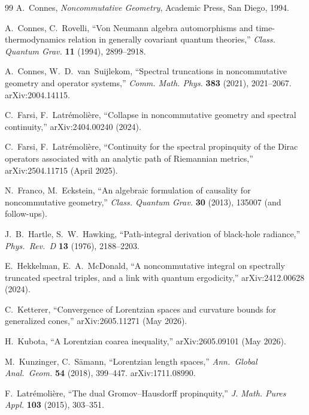 \documentclass[11pt,a4paper]{article}
\theoremstyle{plain}
\theoremstyle{definition}
\begin{document}
\begin{thebibliography}{99}
A.~Connes, \emph{Noncommutative Geometry}, Academic Press, San Diego,
1994.

A.~Connes, C.~Rovelli, ``Von Neumann algebra automorphisms and
time-thermodynamics relation in generally covariant quantum theories,''
\emph{Class. Quantum Grav.} \textbf{11} (1994), 2899--2918.

A.~Connes, W.~D.~van~Suijlekom, ``Spectral truncations in
noncommutative geometry and operator systems,''
\emph{Comm. Math. Phys.} \textbf{383} (2021), 2021--2067.
arXiv:2004.14115.

C.~Farsi, F.~Latr\'emoli\`ere, ``Collapse in noncommutative geometry
and spectral continuity,'' arXiv:2404.00240 (2024).

C.~Farsi, F.~Latr\'emoli\`ere, ``Continuity for the spectral
propinquity of the Dirac operators associated with an analytic path
of Riemannian metrics,'' arXiv:2504.11715 (April 2025).

N.~Franco, M.~Eckstein, ``An algebraic formulation of causality for
noncommutative geometry,''
\emph{Class. Quantum Grav.} \textbf{30} (2013), 135007 (and
follow-ups).

J.~B.~Hartle, S.~W.~Hawking, ``Path-integral derivation of black-hole
radiance,'' \emph{Phys.~Rev.~D} \textbf{13} (1976), 2188--2203.

E.~Hekkelman, E.~A.~McDonald, ``A noncommutative integral on
spectrally truncated spectral triples, and a link with quantum
ergodicity,'' arXiv:2412.00628 (2024).

C.~Ketterer, ``Convergence of Lorentzian spaces and curvature bounds
for generalized cones,'' arXiv:2605.11271 (May 2026).

H.~Kubota, ``A Lorentzian coarea inequality,'' arXiv:2605.09101
(May 2026).

M.~Kunzinger, C.~S\"amann, ``Lorentzian length spaces,''
\emph{Ann.~Global Anal.~Geom.} \textbf{54} (2018), 399--447.
arXiv:1711.08990.

F.~Latr\'emoli\`ere, ``The dual Gromov--Hausdorff propinquity,''
\emph{J. Math. Pures Appl.} \textbf{103} (2015), 303--351.


\end{thebibliography}
\end{document}
